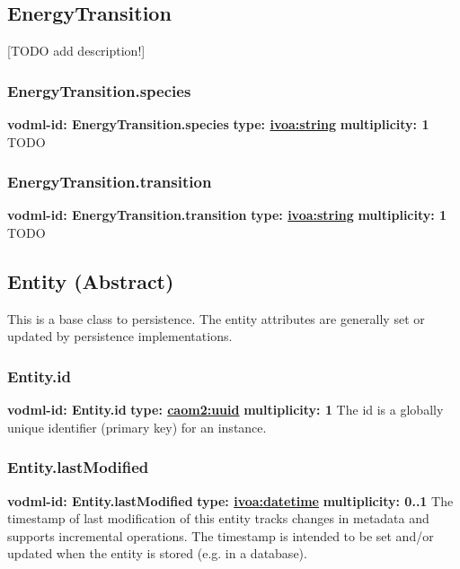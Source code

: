   \subsection{EnergyTransition}
  \label{sect:EnergyTransition}
    [TODO add description!]

    \subsubsection{EnergyTransition.species}
      \textbf{vodml-id: EnergyTransition.species} \newline
      \textbf{type: \hyperref[sect:ivoa]{ivoa:string}} \newline
      \textbf{multiplicity: 1} \newline
      TODO

    \subsubsection{EnergyTransition.transition}
      \textbf{vodml-id: EnergyTransition.transition} \newline
      \textbf{type: \hyperref[sect:ivoa]{ivoa:string}} \newline
      \textbf{multiplicity: 1} \newline
      TODO

  \subsection{Entity (Abstract)}
  \label{sect:Entity}
    This is a base class to persistence. The entity attributes are generally set or updated by persistence implementations.

    \subsubsection{Entity.id}
      \textbf{vodml-id: Entity.id} \newline
      \textbf{type: \hyperref[sect:uuid]{caom2:uuid}} \newline
      \textbf{multiplicity: 1} \newline
      The id is a globally unique identifier (primary key) for an instance.

    \subsubsection{Entity.lastModified}
      \textbf{vodml-id: Entity.lastModified} \newline
      \textbf{type: \hyperref[sect:ivoa]{ivoa:datetime}} \newline
      \textbf{multiplicity: 0..1} \newline
      The timestamp of last modification of this entity tracks changes in metadata and supports incremental operations. The timestamp is intended to be set and/or updated when the entity is stored (e.g. in a database).

